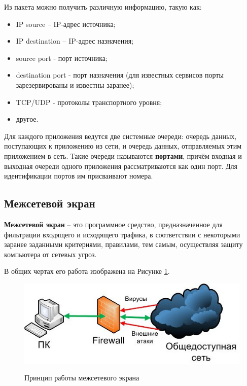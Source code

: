 \newpage

Из пакета можно получить различную информацию, такую как:
\begin{itemize}
	\item IP source – IP-адрес источника;
	
	\item IP destination – IP-адрес назначения;
	
	\item source port - порт источника;
	
	\item destination port - порт назначения (для известных сервисов порты зарезервированы и известны заранее);
	
	\item TCP/UDP - протоколы транспортного уровня;
	
	\item другое. \\
\end{itemize}

Для каждого приложения ведутся две системные очереди: очередь данных, поступающих к приложению из сети, и очередь данных, отправляемых этим приложением в сеть. Такие очереди называются \textbf{портами}, причём входная и выходная очереди одного приложения рассматриваются как один порт. Для идентификации портов им присваивают номера. \newline

\subsection{Межсетевой экран}
\textbf{Межсетевой экран} -- это программное средство, предназначенное для фильтрации входящего и исходящего трафика, в соответствии с некоторыми заранее заданными критериями, правилами, тем самым, осуществляя защиту компьютера от сетевых угроз. 

В общих чертах его работа изображена на Рисунке \ref{fig1:image}.

\begin{figure}[ph!]
	\centering
	\begin{center}
		{\includegraphics[scale=0.5]{img/firewall.jpg}}
		\caption{Принцип работы межсетевого экрана}
		\label{fig1:image}
	\end{center}
\end{figure}

